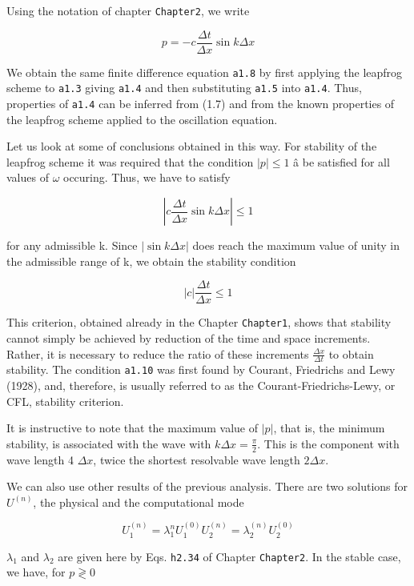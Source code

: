 Using the notation of chapter \texttt{Chapter2}, we write

{\[p = - c\frac{\Delta t}{\Delta x}\sin{k\Delta x}\]}

We obtain the same finite difference equation \texttt{a1.8} by first
applying the leapfrog scheme to \texttt{a1.3} giving \texttt{a1.4} and
then substituting \texttt{a1.5} into \texttt{a1.4}. Thus, properties of
\texttt{a1.4} can be inferred from (1.7) and from the known properties
of the leapfrog scheme applied to the oscillation equation.

Let us look at some of conclusions obtained in this way. For stability
of the leapfrog scheme it was required that the condition
\(\left| p \right| \leq 1 \) â be satisfied for all values of \(\omega\)
occuring. Thus, we have to satisfy

\[\left| c\frac{\Delta t}{\Delta x}\sin{k\Delta x } \right| \leq 1\]

for any admissible k. Since \(\left| \sin{k\Delta x} \right|\) does
reach the maximum value of unity in the admissible range of k, we obtain
the stability condition

{\[\left| c \right|\frac{\Delta t}{\Delta x} \leq 1\]}

This criterion, obtained already in the Chapter \texttt{Chapter1}, shows
that stability cannot simply be achieved by reduction of the time and
space increments. Rather, it is necessary to reduce the ratio of these
increments \(\frac{\Delta x}{\Delta t }\) to obtain stability. The
condition \texttt{a1.10} was first found by Courant, Friedrichs and Lewy
(1928), and, therefore, is usually referred to as the
Courant-Friedrichs-Lewy, or CFL, stability criterion.

It is instructive to note that the maximum value of
\(\left| p \right|\), that is, the minimum stability, is associated with
the wave with \(k\Delta x = \frac{\pi}{2}\). This is the component with
wave length 4 \(\Delta x\), twice the shortest resolvable wave length
\(2\Delta x\).

We can also use other results of the previous analysis. There are two
solutions for \(U^{\left( n \right)}\), the physical and the
computational mode

{\[U_{1}^{\left( n \right)} = \lambda_{1}^{n}U_{1}^{\left( 0 \right)}U_{2}^{\left( n \right)} 
= \lambda_{2}^{\left( n \right)}U_{2}^{\left( 0 \right)}\]}

\(\lambda_{1}\) and \(\lambda_{2 }\) are given here by Eqs.
\texttt{h2.34} of Chapter \texttt{Chapter2}. In the stable case, we
have, for \(p \gtrless 0\)

